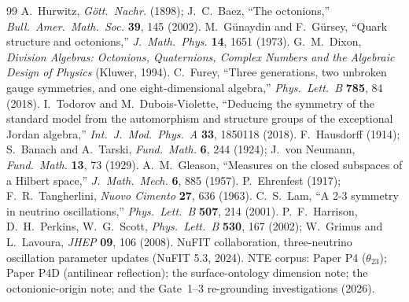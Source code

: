 \documentclass[11pt]{article}
\theoremstyle{definition}
\begin{document}
\begin{thebibliography}{99}
\small
{} A.\ Hurwitz, \emph{G\"ott.\ Nachr.} (1898); J.\ C.\ Baez, ``The octonions,'' \emph{Bull.\ Amer.\ Math.\ Soc.} \textbf{39}, 145 (2002).
 M.\ G\"unaydin and F.\ G\"ursey, ``Quark structure and octonions,'' \emph{J.\ Math.\ Phys.} \textbf{14}, 1651 (1973).
 G.\ M.\ Dixon, \emph{Division Algebras: Octonions, Quaternions, Complex Numbers and the Algebraic Design of Physics} (Kluwer, 1994).
 C.\ Furey, ``Three generations, two unbroken gauge symmetries, and one eight-dimensional algebra,'' \emph{Phys.\ Lett.\ B} \textbf{785}, 84 (2018).
 I.\ Todorov and M.\ Dubois-Violette, ``Deducing the symmetry of the standard model from the automorphism and structure groups of the exceptional Jordan algebra,'' \emph{Int.\ J.\ Mod.\ Phys.\ A} \textbf{33}, 1850118 (2018).
 F.\ Hausdorff (1914); S.\ Banach and A.\ Tarski, \emph{Fund.\ Math.} \textbf{6}, 244 (1924); J.\ von Neumann, \emph{Fund.\ Math.} \textbf{13}, 73 (1929).
 A.\ M.\ Gleason, ``Measures on the closed subspaces of a Hilbert space,'' \emph{J.\ Math.\ Mech.} \textbf{6}, 885 (1957).
 P.\ Ehrenfest (1917); F.\ R.\ Tangherlini, \emph{Nuovo Cimento} \textbf{27}, 636 (1963).
 C.\ S.\ Lam, ``A 2-3 symmetry in neutrino oscillations,'' \emph{Phys.\ Lett.\ B} \textbf{507}, 214 (2001).
 P.\ F.\ Harrison, D.\ H.\ Perkins, W.\ G.\ Scott, \emph{Phys.\ Lett.\ B} \textbf{530}, 167 (2002); W.\ Grimus and L.\ Lavoura, \emph{JHEP} \textbf{09}, 106 (2008).
 NuFIT collaboration, three-neutrino oscillation parameter updates (NuFIT 5.3, 2024).
 NTE corpus: Paper P4 ($\theta_{23}$); Paper P4D (antilinear reflection); the surface-ontology dimension note; the octonionic-origin note; and the Gate~1--3 re-grounding investigations (2026).
\end{thebibliography}
\end{document}
